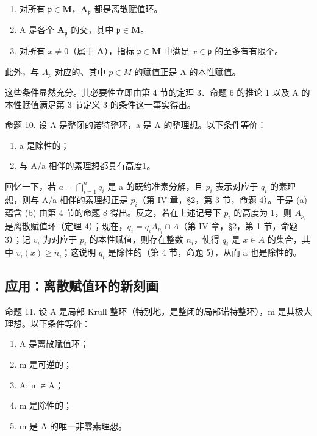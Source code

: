 \begin{enumerate}
\def\labelenumi{(\roman{enumi})}
\item
  对所有 \(\mathfrak{p} \in \mathbf{M}\)，\(\mathbf{A}_{\mathfrak{p}}\) 都是离散赋值环。
\item
  A 是各个 \(\mathbf{A}_{\mathfrak{p}}\) 的交，其中 \(\mathfrak{p} \in \mathbf{M}\)。
\item
  对所有 \(x \neq 0\)（属于 \(\mathbf{A}\)），指标 \(\mathfrak{p} \in \mathbf{M}\) 中满足 \(x \in \mathfrak{p}\) 的至多有有限个。
\end{enumerate}

此外，与 \(A_{p}\) 对应的、其中 \(p \in M\) 的赋值正是 A 的本性赋值。

这些条件显然充分。其必要性立即由第 4 节的定理 3、命题 6 的推论 1 以及 A 的本性赋值满足第 3 节定义 3 的条件这一事实得出。

命题 10. 设 A 是整闭的诺特整环，a 是 A 的整理想。以下条件等价：

\begin{enumerate}
\def\labelenumi{(\alph{enumi})}
\item
  a 是除性的；
\item
  与 A/a 相伴的素理想都具有高度1。
\end{enumerate}

回忆一下，若 \(a = \bigcap_{i=1}^{n} q_i\) 是 a 的既约准素分解，且 \(p_i\) 表示对应于 \(q_i\) 的素理想，则与 A/a 相伴的素理想正是 \(p_i\)（第 IV 章，§2，第 3 节，命题 4）。于是 (a) 蕴含 (b) 由第 4 节的命题 8 得出。反之，若在上述记号下 \(p_i\) 的高度为 1，则 \(A_{p_i}\) 是离散赋值环（定理 4）；现在，\(q_i = q_i A_{p_i} \cap A\)（第 IV 章，§2，第 1 节，命题 3）；记 \(v_i\) 为对应于 \(p_i\) 的本性赋值，则存在整数 \(n_i\)，使得 \(q_i\) 是 \(x \in A\) 的集合，其中 \(v_i(x) \geqslant n_i\)；这说明 \(q_i\) 是除性的（第 4 节，命题 5），从而 a 也是除性的。

\subsection{应用：离散赋值环的新刻画}

命题 11. 设 A 是局部 Krull 整环（特别地，是整闭的局部诺特整环），m 是其极大理想。以下条件等价：

\begin{enumerate}
\def\labelenumi{(\alph{enumi})}
\item
  A 是离散赋值环；
\item
  m 是可逆的；
\item
  A: m ≠ A；
\item
  m 是除性的；
\item
  m 是 A 的唯一非零素理想。
\end{enumerate}

